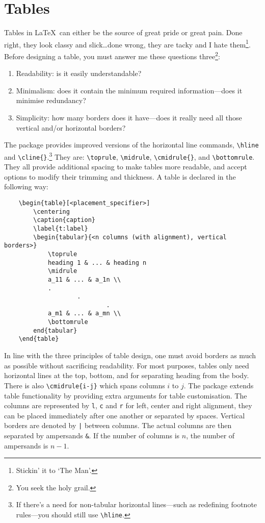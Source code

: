 \section{Tables}
%
Tables in \LaTeX~can either be the source of great pride or great
pain.  Done right, they look classy and slick\ldots done wrong, they
are tacky and I hate them\footnote{Stickin' it to `The Man'.}.  Before
designing a table, you must answer me these questions
three\footnote{You seek the holy grail.}:
\begin{enumerate}
\item Readability: is it easily understandable?
\item Minimalism: does it contain the minimum required
  information---does it minimise redundancy?
\item Simplicity: how many borders does it have---does it really need
  all those vertical and/or horizontal borders?
\end{enumerate}
The package  provides improved versions of the
horizontal line commands, \verb|\hline| and
\verb|\cline{}|.\footnote{If there's a need for non-tabular horizontal
  lines---such as redefining footnote rules---you should still use
  \texttt{\textbackslash hline}.}  They are: \verb|\toprule|,
\verb|\midrule|, \verb|\cmidrule{}|, and \verb|\bottomrule|.  They all
provide additional spacing to make tables more readable, and accept
options to modify their trimming and thickness.  A table is declared
in the following way:
\begin{verbatim}
	\begin{table}[<placement_specifier>]
	    \centering
	    \caption{caption}
	    \label{t:label}
	    \begin{tabular}{<n columns (with alignment), vertical borders>}
	        \toprule
	        heading 1 & ... & heading n
	        \midrule
	        a_11 & ... & a_1n \\
	        .
	                .
	                        .
	        a_m1 & ... & a_mn \\
	        \bottomrule
	    end{tabular}
	\end{table}
\end{verbatim}

In line with the three principles of table design, one must avoid
borders as much as possible without sacrificing readability.  For most
purposes, tables only need horizontal lines at the top, bottom, and
for separating heading from the body.  There is also
\verb|\cmidrule{i-j}| which spans columns $i$ to $j$.  The
 package extends table functionality by providing extra
arguments for table customisation.  The columns are represented by
\verb|l|, \verb|c| and \verb|r| for left, center and right alignment,
they can be placed immediately after one another or separated by
spaces.  Vertical borders are denoted by \verb+|+ between columns.
The actual columns are then separated by ampersands \verb|&|.  If the
number of columns is $n$, the number of ampersands is $n-1$.

